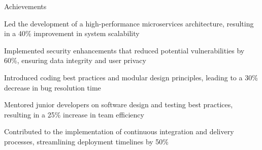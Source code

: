\documentclass{resume} %
\begin{document}
    \begin{rSection}{Achievements}
        \begin{rSubsection}{}{}{}
                            \item Led the development of a high{-}performance microservices architecture, resulting in a 40\% improvement in system scalability
                            \item Implemented security enhancements that reduced potential vulnerabilities by 60\%, ensuring data integrity and user privacy
                            \item Introduced coding best practices and modular design principles, leading to a 30\% decrease in bug resolution time
                            \item Mentored junior developers on software design and testing best practices, resulting in a 25\% increase in team efficiency
                            \item Contributed to the implementation of continuous integration and delivery processes, streamlining deployment timelines by 50\%
                    \end{rSubsection}
    \end{rSection}
\end{document}
